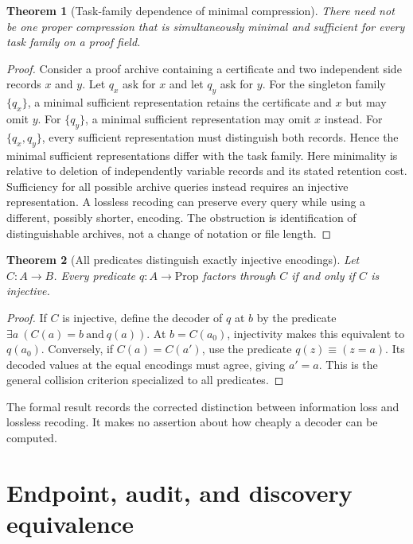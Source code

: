 \documentclass[11pt,oneside]{article}
\newtheorem{theorem}{Theorem}[section]
\theoremstyle{definition}
\theoremstyle{remark}
\begin{document}
\begin{theorem}[Task-family dependence of minimal compression]
There need not be one proper compression that is simultaneously minimal and sufficient for every task family on a proof field.
\end{theorem}

\begin{proof}
Consider a proof archive containing a certificate and two independent side records $x$ and $y$. Let $q_x$ ask for $x$ and let $q_y$ ask for $y$. For the singleton family $\{q_x\}$, a minimal sufficient representation retains the certificate and $x$ but may omit $y$. For $\{q_y\}$, a minimal sufficient representation may omit $x$ instead. For $\{q_x,q_y\}$, every sufficient representation must distinguish both records. Hence the minimal sufficient representations differ with the task family. Here minimality is relative to deletion of independently variable records and its stated retention cost. Sufficiency for all possible archive queries instead requires an injective representation. A lossless recoding can preserve every query while using a different, possibly shorter, encoding. The obstruction is identification of distinguishable archives, not a change of notation or file length.
\end{proof}

\begin{theorem}[All predicates distinguish exactly injective encodings]
\label{thm:injective-compression}
Let $C:A\to B$. Every predicate $q:A\to\mathrm{Prop}$ factors through $C$ if and only if $C$ is injective.
\end{theorem}
\begin{proof}
If $C$ is injective, define the decoder of $q$ at $b$ by the predicate $\exists a\ (C(a)=b\ \text{and}\ q(a))$. At $b=C(a_0)$, injectivity makes this equivalent to $q(a_0)$. Conversely, if $C(a)=C(a')$, use the predicate $q(z)\equiv(z=a)$. Its decoded values at the equal encodings must agree, giving $a'=a$. This is the general collision criterion specialized to all predicates.
\end{proof}

The formal result  records the corrected distinction between information loss and lossless recoding. It makes no assertion about how cheaply a decoder can be computed.

\section{Endpoint, audit, and discovery equivalence}
\end{document}
